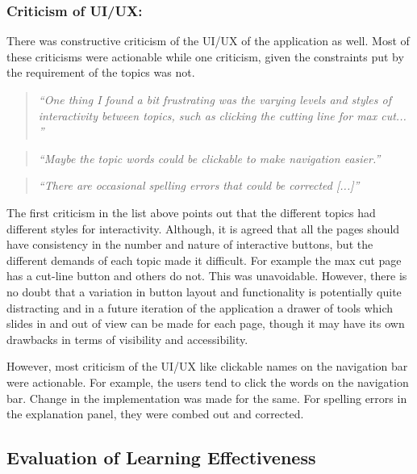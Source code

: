 \subsubsection{Criticism of UI/UX:}
There was constructive criticism of the UI/UX of the application as well.
Most of these criticisms were actionable while one criticism, given the
constraints put by the requirement of the topics was not.

\begin{quote}
\emph{``One thing I found a bit frustrating was the varying levels and styles of
interactivity between topics, such as clicking the cutting line for max cut... ''}
\end{quote}

\vspace{0.06 in}

\begin{quote}
\emph{``Maybe the topic words could be clickable to make navigation easier.''}
\end{quote}

\vspace{0.06 in}
\begin{quote}
\emph{``There are occasional spelling errors that
   could be corrected [...]'' }
\end{quote}

The first criticism in the list above points out that the different topics had
different styles for interactivity.  Although, it is agreed that all the pages
should have consistency in the number and nature of interactive buttons, but the different demands of each topic made it difficult. For example the max
cut page has a cut-line button and others do not. This was unavoidable.
However, there is no doubt that a variation in button layout and
functionality is potentially quite distracting and in a future iteration
of the application a drawer of tools which slides in and out of view can be made for
each page, though it may have its own drawbacks in terms of visibility and
accessibility.

However, most criticism of the UI/UX like clickable names on the navigation bar
were actionable.  For example, the users tend to click the words on the
navigation bar. Change in the implementation was made for the same. For
spelling errors in the explanation panel, they were combed out and corrected.


\subsection{Evaluation of Learning Effectiveness}

